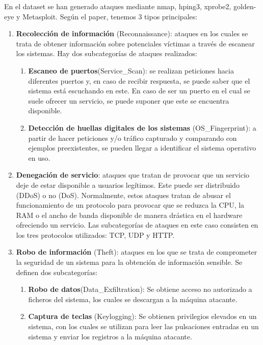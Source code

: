 En el dataset se han generado ataques mediante nmap, hping3, xprobe2, golden-eye y Metasploit. Según el paper, tenemos 3 tipos principales: 
\begin{enumerate}
    \item \textbf{Recolección de información} (Reconnaissance): ataques en los cuales se trata de obtener información sobre potenciales víctimas a través de escanear los sistemas. Hay dos subcategorías de ataques realizados:
    \begin{enumerate}
        \item \textbf{Escaneo de puertos}(Service\_Scan): se realizan peticiones hacia diferentes puertos y, en caso de recibir respuesta, se puede saber que el sistema está escuchando en este. En caso de ser un puerto en el cual se suele ofrecer un servicio, se puede suponer que este se encuentra disponible.
        \item \textbf{Detección de huellas digitales de los sistemas} (OS\_Fingerprint): a partir de hacer peticiones y/o tráfico capturado y comparando con ejemplos preexistentes, se pueden llegar a identificar el sistema operativo en uso.
    \end{enumerate}
    \item \textbf{Denegación de servicio}: ataques que tratan de provocar que un servicio deje de estar disponible a usuarios legítimos. Este puede ser distribuido (DDoS) o no (DoS). Normalmente, estos ataques tratan de abusar el funcionamiento de un protocolo para provocar que se reduzca la CPU, la RAM o el ancho de banda disponible de manera drástica en el hardware ofreciendo un servicio. Las subcategorías de ataques en este caso consisten en los tres protocolos utilizados: TCP, UDP y HTTP.
    \item \textbf{Robo de información} (Theft): ataques en los que se trata de comprometer la seguridad de un sistema para la obtención de información sensible. Se definen dos subcategorías:
    \begin{enumerate}
        \item \textbf{Robo de datos}(Data\_Exfiltration): Se obtiene acceso no autorizado a ficheros del sistema, los cuales se descargan a la máquina atacante.
        \item \textbf{Captura de teclas} (Keylogging): Se obtienen privilegios elevados en un sistema, con los cuales se utilizan para leer las pulsaciones entradas en un sistema y enviar los registros a la máquina atacante.
    \end{enumerate}
\end{enumerate}

